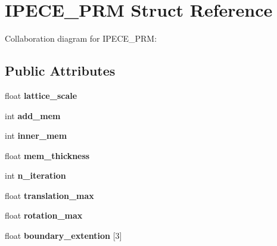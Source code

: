 \hypertarget{struct_i_p_e_c_e___p_r_m}{\section{I\-P\-E\-C\-E\-\_\-\-P\-R\-M Struct Reference}
\label{struct_i_p_e_c_e___p_r_m}
}


Collaboration diagram for I\-P\-E\-C\-E\-\_\-\-P\-R\-M\-:
\subsection*{Public Attributes}
\begin{DoxyCompactItemize}
\item 
\hypertarget{struct_i_p_e_c_e___p_r_m_aba75d2505d603dae0ef1cd5e9d37c8fd}{float {\bfseries lattice\-\_\-scale}}\label{struct_i_p_e_c_e___p_r_m_aba75d2505d603dae0ef1cd5e9d37c8fd}

\item 
\hypertarget{struct_i_p_e_c_e___p_r_m_ac9832fa35a87a718a6ca212fd3846807}{int {\bfseries add\-\_\-mem}}\label{struct_i_p_e_c_e___p_r_m_ac9832fa35a87a718a6ca212fd3846807}

\item 
\hypertarget{struct_i_p_e_c_e___p_r_m_a7af4381379837b440c613dfc52c80e36}{int {\bfseries inner\-\_\-mem}}\label{struct_i_p_e_c_e___p_r_m_a7af4381379837b440c613dfc52c80e36}

\item 
\hypertarget{struct_i_p_e_c_e___p_r_m_a6164179c0bfbebc0b11e0d1836049278}{float {\bfseries mem\-\_\-thickness}}\label{struct_i_p_e_c_e___p_r_m_a6164179c0bfbebc0b11e0d1836049278}

\item 
\hypertarget{struct_i_p_e_c_e___p_r_m_a9901cc79acee5fccd7138bbe0fe33e9e}{int {\bfseries n\-\_\-iteration}}\label{struct_i_p_e_c_e___p_r_m_a9901cc79acee5fccd7138bbe0fe33e9e}

\item 
\hypertarget{struct_i_p_e_c_e___p_r_m_a8989e2748e2cf0023087aaddf4d3ad92}{float {\bfseries translation\-\_\-max}}\label{struct_i_p_e_c_e___p_r_m_a8989e2748e2cf0023087aaddf4d3ad92}

\item 
\hypertarget{struct_i_p_e_c_e___p_r_m_a0224ac33499fc81e4ddfe5ad6de579f3}{float {\bfseries rotation\-\_\-max}}\label{struct_i_p_e_c_e___p_r_m_a0224ac33499fc81e4ddfe5ad6de579f3}

\item 
\hypertarget{struct_i_p_e_c_e___p_r_m_a981d9ce27cb7db2fe6e3cdc0f6b1175d}{float {\bfseries boundary\-\_\-extention} \mbox{[}3\mbox{]}}\label{struct_i_p_e_c_e___p_r_m_a981d9ce27cb7db2fe6e3cdc0f6b1175d}


\end{DoxyCompactItemize}

